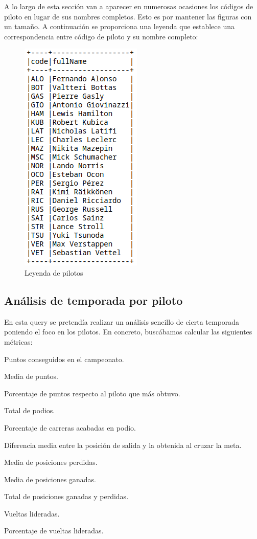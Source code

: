 \documentclass[12pt,twoside,titlepage]{report}
\begin{document}
A lo largo de esta sección van a aparecer en numerosas ocasiones los códigos de piloto en lugar de sus nombres completos. Esto es por mantener las figuras con un tamaño. A continuación se proporciona una leyenda que establece una correspondencia entre código de piloto y su nombre completo:

\begin{figure}[H]
	\includegraphics[scale=0.4]{leyendapilotos.png}
	\centering
	\caption{Leyenda de pilotos}
	\label{fig:leyendapilotos}
	\centering
\end{figure}


\subsection{Análisis de temporada por piloto}

En esta query se pretendía realizar un análisis sencillo de cierta temporada poniendo el foco en los pilotos. En concreto, buscábamos calcular las siguientes métricas:

\begin{compactitem}
	\item Puntos conseguidos en el campeonato.
	\item Media de puntos.
	\item Porcentaje de puntos respecto al piloto que más obtuvo.
	\item Total de podios.
	\item Porcentaje de carreras acabadas en podio.
	\item Diferencia media entre la posición de salida y la obtenida al cruzar la meta.
	\item Media de posiciones perdidas.
	\item Media de posiciones ganadas.
	\item Total de posiciones ganadas y perdidas.
	\item Vueltas lideradas.
	\item Porcentaje de vueltas lideradas.
\end{compactitem}
\end{document}
